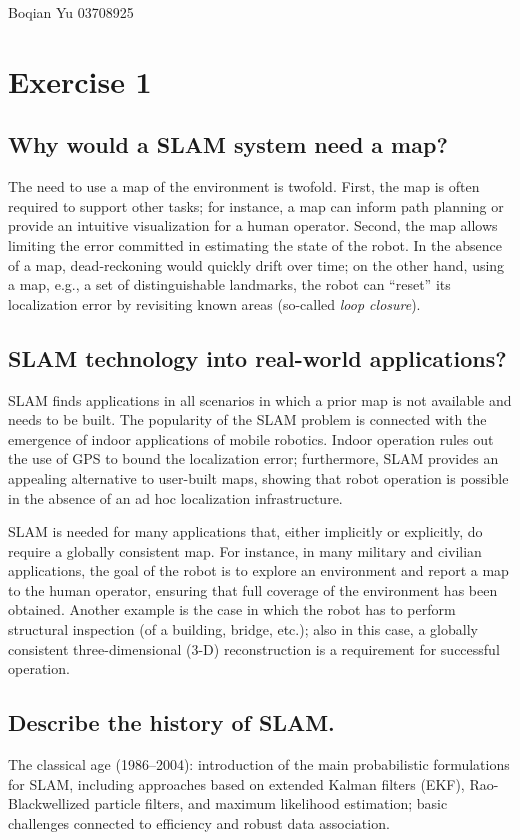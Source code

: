 \documentclass[a4paper, 12pt]{article}
\begin{document}
    Boqian Yu 03708925
	\section{Exercise 1}
        \subsection{Why would a SLAM system need a map?}
        The need to use a map of the environment is twofold. First, the map is often required to support other tasks; for instance, a map can inform path planning or provide an intuitive visualization for a human operator. Second, the map allows limiting the error committed in estimating the state of the robot. In the absence of a map, dead-reckoning would quickly drift over time; on the other hand, using a map, e.g., a set of distinguishable landmarks, the robot can “reset” its localization error by revisiting known areas (so-called \textit{loop closure}).
        \subsection{SLAM technology into real-world applications?}
        SLAM finds applications in all scenarios in which a prior map is not available and needs to be built. The popularity of the SLAM problem is connected with the emergence of indoor applications of mobile robotics. Indoor operation rules out the use of GPS to bound the localization error; furthermore, SLAM provides an appealing alternative to user-built maps, showing that robot operation is possible in the absence of an ad hoc localization infrastructure.
        
        SLAM is needed for many applications that, either implicitly or explicitly, do require a globally consistent map. For instance, in many military and civilian applications, the goal of the robot is to explore an environment and report a map to the human operator, ensuring that full coverage of the environment has been obtained. Another example is the case in which the robot has to perform structural inspection (of a building, bridge, etc.); also in this case, a globally consistent three-dimensional (3-D) reconstruction is a requirement for successful operation.
        \subsection{Describe the history of SLAM.}
        The classical age (1986–2004): introduction of the main probabilistic formulations for SLAM, including approaches based on extended Kalman filters (EKF), Rao-Blackwellized particle filters, and maximum likelihood estimation; basic challenges connected to efficiency and robust data association.
        
\end{document}
